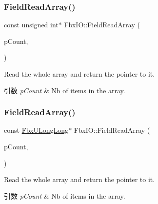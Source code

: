 \subsubsection{\texorpdfstring{Field\+Read\+Array()}{FieldReadArray()}\hspace{0.1cm}{\footnotesize\ttfamily [4/11]}}
{\footnotesize\ttfamily const unsigned int$\ast$ Fbx\+I\+O\+::\+Field\+Read\+Array (\begin{DoxyParamCaption}\item[{int \&}]{p\+Count,  }\item[{const unsigned int $\ast$}]{ }\end{DoxyParamCaption})}

Read the whole array and return the pointer to it. 
\begin{DoxyParams}{引数}
{\em p\+Count} & Nb of items in the array. \\
\hline
\end{DoxyParams}
\mbox{\label{class_fbx_i_o_a6f005d982d421a395c0ca43ba506bd40}} 
\subsubsection{\texorpdfstring{Field\+Read\+Array()}{FieldReadArray()}\hspace{0.1cm}{\footnotesize\ttfamily [5/11]}}
{\footnotesize\ttfamily const \hyperlink{fbxtypes_8h_a267f848573cc1e685aa510be4b1298c8}{Fbx\+U\+Long\+Long}$\ast$ Fbx\+I\+O\+::\+Field\+Read\+Array (\begin{DoxyParamCaption}\item[{int \&}]{p\+Count,  }\item[{const \hyperlink{fbxtypes_8h_a267f848573cc1e685aa510be4b1298c8}{Fbx\+U\+Long\+Long} $\ast$}]{ }\end{DoxyParamCaption})}

Read the whole array and return the pointer to it. 
\begin{DoxyParams}{引数}
{\em p\+Count} & Nb of items in the array. \\
\hline
\end{DoxyParams}
\mbox{\label{class_fbx_i_o_a7cb565e52225df5537d377506f971eae}} 
